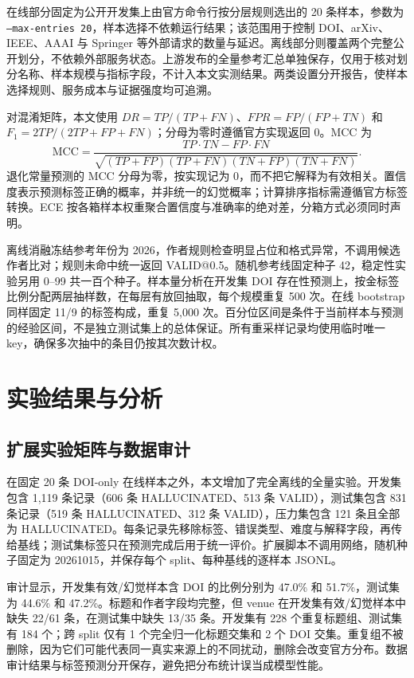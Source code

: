 \documentclass[UTF8,a4paper,11pt]{ctexart}
\begin{document}
在线部分固定为公开开发集上由官方命令行按分层规则选出的 20 条样本，参数为 \texttt{--max-entries 20}，样本选择不依赖运行结果；该范围用于控制 DOI、arXiv、IEEE、AAAI 与 Springer 等外部请求的数量与延迟。离线部分则覆盖两个完整公开划分，不依赖外部服务状态。上游发布的全量参考汇总单独保存，仅用于核对划分名称、样本规模与指标字段，不计入本文实测结果。两类设置分开报告，使样本选择规则、服务成本与证据强度均可追溯。

对混淆矩阵，本文使用 $DR=TP/(TP+FN)$、$FPR=FP/(FP+TN)$ 和 $F_1=2TP/(2TP+FP+FN)$；分母为零时遵循官方实现返回 0。MCC 为
\begin{equation}
\mathrm{MCC}=\frac{TP\cdot TN-FP\cdot FN}
{\sqrt{(TP+FP)(TP+FN)(TN+FP)(TN+FN)}}.
\end{equation}
退化常量预测的 MCC 分母为零，按实现记为 0，而不把它解释为有效相关。置信度表示预测标签正确的概率，并非统一的幻觉概率；计算排序指标需遵循官方标签转换。ECE 按各箱样本权重聚合置信度与准确率的绝对差，分箱方式必须同时声明。

离线消融冻结参考年份为 2026，作者规则检查明显占位和格式异常，不调用候选作者比对；规则未命中统一返回 VALID@0.5。随机参考线固定种子 42，稳定性实验另用 0--99 共一百个种子。样本量分析在开发集 DOI 存在性预测上，按金标签比例分配两层抽样数，在每层有放回抽取，每个规模重复 500 次。在线 bootstrap 同样固定 11/9 的标签构成，重复 5,000 次。百分位区间是条件于当前样本与预测的经验区间，不是独立测试集上的总体保证。所有重采样记录均使用临时唯一 key，确保多次抽中的条目仍按其次数计权。

\section{实验结果与分析}

\subsection{扩展实验矩阵与数据审计}

在固定 20 条 DOI-only 在线样本之外，本文增加了完全离线的全量实验。开发集包含 1,119 条记录（606 条 HALLUCINATED、513 条 VALID），测试集包含 831 条记录（519 条 HALLUCINATED、312 条 VALID），压力集包含 121 条且全部为 HALLUCINATED。每条记录先移除标签、错误类型、难度与解释字段，再传给基线；测试集标签只在预测完成后用于统一评价。扩展脚本不调用网络，随机种子固定为 20261015，并保存每个 split、每种基线的逐样本 JSONL。

审计显示，开发集有效/幻觉样本含 DOI 的比例分别为 47.0\% 和 51.7\%，测试集为 44.6\% 和 47.2\%。标题和作者字段均完整，但 venue 在开发集有效/幻觉样本中缺失 22/61 条，在测试集中缺失 13/35 条。开发集有 228 个重复标题组、测试集有 184 个；跨 split 仅有 1 个完全归一化标题交集和 2 个 DOI 交集。重复组不被删除，因为它们可能代表同一真实来源上的不同扰动，删除会改变官方分布。数据审计结果与标签预测分开保存，避免把分布统计误当成模型性能。
\end{document}

